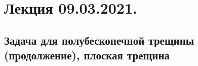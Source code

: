 \documentclass[main.tex]{subfiles}
\begin{document}

\section{Лекция 09.03.2021.}

\subsection{Задача для полубесконечной трещины (продолжение), плоская трещина}
\end{document}

